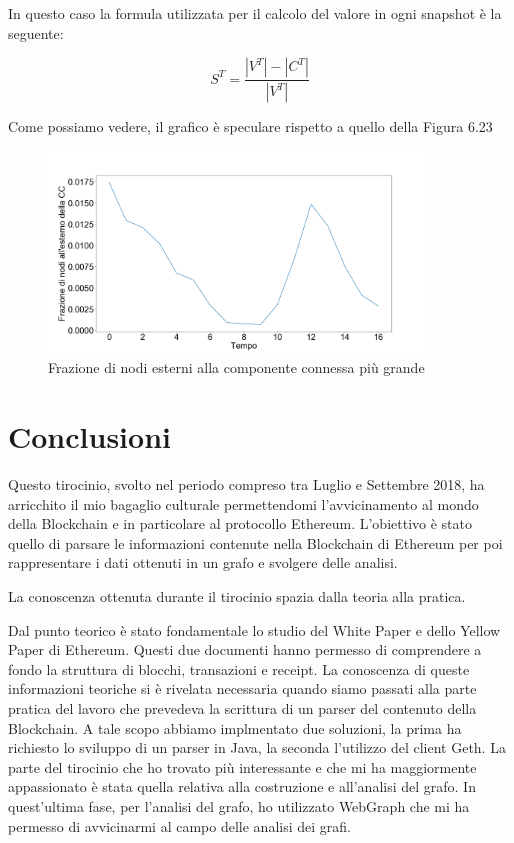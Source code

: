 \documentclass[12pt]{report}
\begin{document}
In questo caso la formula utilizzata per il calcolo del valore in ogni snapshot è la seguente:

\begin{equation}
    S^T = \frac{|V^T| - |C^T|}{|V^T|}
\end{equation}

Come possiamo vedere, il grafico è speculare rispetto a quello della Figura 6.23

\begin{figure}[H]
    \centering\includegraphics[width=0.9\textwidth]{GiantCCSpeculare.png}
    \caption{Frazione di nodi esterni alla componente connessa più grande}
\end{figure}

\chapter{Conclusioni}

Questo tirocinio, svolto nel periodo compreso tra Luglio e Settembre 2018, ha arricchito il mio bagaglio culturale permettendomi l'avvicinamento al mondo della Blockchain e in particolare al protocollo Ethereum.
L'obiettivo è stato quello di parsare le informazioni contenute nella Blockchain di Ethereum per poi rappresentare i dati ottenuti in un grafo e svolgere delle analisi.

La conoscenza ottenuta durante il tirocinio spazia dalla teoria alla pratica.

Dal punto teorico è stato fondamentale lo studio del White Paper e dello Yellow Paper di Ethereum. Questi due documenti hanno permesso di comprendere a fondo la struttura di blocchi, transazioni e receipt.
La conoscenza di queste informazioni teoriche si è rivelata necessaria quando siamo passati alla parte pratica del lavoro che prevedeva la scrittura di un parser del contenuto della Blockchain. A tale scopo abbiamo implmentato due soluzioni, la prima ha richiesto lo sviluppo di un parser in Java, la seconda l'utilizzo del client Geth.
La parte del tirocinio che ho trovato più interessante e che mi ha maggiormente appassionato è stata quella relativa alla costruzione e all'analisi del grafo.
In quest'ultima fase, per l'analisi del grafo, ho utilizzato WebGraph che mi ha permesso di avvicinarmi al campo delle analisi dei grafi.
\end{document}
